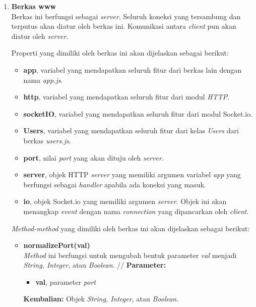 \begin{enumerate}
\begin{enumerate}
\begin{itemize}
		\end{itemize}
	
		\item \textbf{Berkas www} \\
		Berkas ini berfungsi sebagai \textit{server}. Seluruh koneksi yang tersambung dan terputus akan diatur oleh berkas ini. Komunikasi antara \textit{client} pun akan diatur oleh \textit{server}.
		
		Properti yang dimiliki oleh berkas ini akan dijelaskan sebagai berikut:
		\begin{itemize}
			\item \textbf{app}, variabel yang mendapatkan seluruh fitur dari berkas lain dengan nama \textit{app.js}.
			\item \textbf{http}, variabel yang mendapatkan seluruh fitur dari modul \textit{HTTP}.
			\item \textbf{socketIO}, variabel yang mendapatkan seluruh fitur dari modul Socket.io.
			\item \textbf{{Users}}, variabel yang mendapatkan seluruh fitur dari kelas \textit{Users} dari berkas \textit{users.js}.
			\item \textbf{port}, nilai \textit{port} yang akan dituju oleh \textit{server}.
			\item \textbf{server}, objek HTTP \textit{server} yang memiliki argumen variabel \textit{app} yang berfungsi sebagai \textit{handler} apabila ada koneksi yang masuk.
			\item \textbf{io}, objek Socket.io yang memiliki argumen \textit{server}. Objek ini akan menangkap \textit{event} dengan nama \textit{connection} yang dipancarkan oleh \textit{client}.
		\end{itemize}
	
		\textit{Method-method} yang dimiliki oleh berkas ini akan dijelaskan sebagai berikut:
		\begin{itemize}
			\item \textbf{normalizePort(val)} \\
			\textit{Method} ini berfungsi untuk mengubah bentuk parameter \textit{val} menjadi \textit{String, Integer}, atau \textit{Boolean}. //
			\textbf{Parameter:}
			\begin{itemize}
				\item \textbf{val}, parameter \textit{port}
			\end{itemize}
			\textbf{Kembalian:} Objek \textit{String, Integer,} atau \textit{Boolean}. 
			
		\end{itemize}
	

\end{enumerate}
\end{enumerate}
